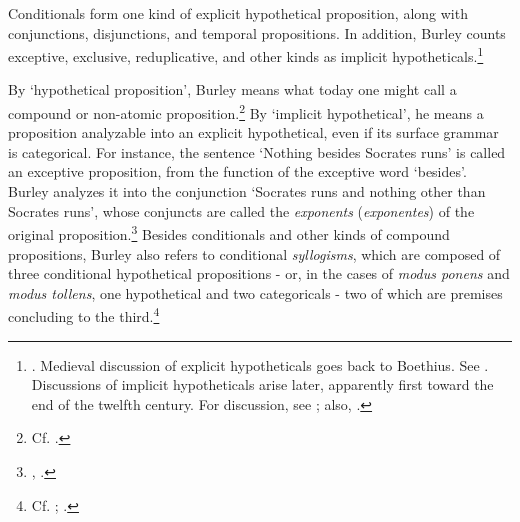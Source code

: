 \documentclass[]{birkjour}
\begin{document}
Conditionals form one kind of explicit hypothetical proposition, along with conjunctions, disjunctions, and temporal propositions. In addition, Burley counts exceptive, exclusive, reduplicative, and other kinds as implicit hypotheticals.\footnote{\autocite[pp. 106-107]{BurleyDPAL}. Medieval discussion of explicit hypotheticals goes back to Boethius. See \autocite[passim]{BHS}. Discussions of implicit hypotheticals arise later, apparently first toward the end of the twelfth century. For discussion, see \autocite{Giusberti1977}; also, \autocite{DeRijk1966}.}

By `hypothetical proposition', Burley means what today one might call a compound or non-atomic proposition.\footnote{Cf. \autocite[p. 66]{Buridan2015}.} By `implicit hypothetical', he means a proposition analyzable into an explicit hypothetical, even if its surface grammar is categorical. For instance, the sentence `Nothing besides Socrates runs' is called an exceptive proposition, from the function of the exceptive word `besides'. Burley analyzes it into the conjunction `Socrates runs and nothing other than Socrates runs', whose conjuncts are called the \textit{exponents} (\textit{exponentes}) of the original proposition.\footnote{\autocite[p. 121, par. 44]{Green-Pedersen1980b}, \autocite[pp. 164-165]{BurleyDPAL}.} Besides conditionals and other kinds of compound propositions, Burley also refers to conditional \textit{syllogisms}, which are composed of three conditional hypothetical propositions - or, in the cases of \textit{modus ponens} and \textit{modus tollens}, one hypothetical and two categoricals - two of which are premises concluding to the third.\footnote{Cf. \autocite[5.1.3, pp. 308-309]{BuridanKlimaSD}; \autocite{Klima2004b}.}
	
\end{document}
